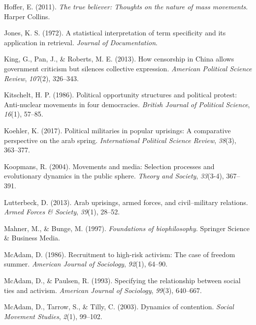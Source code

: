 \documentclass[
  english,
  man]{apa6}
\begin{document}
\leavevmode\hypertarget{ref-Hoffer2011true}{}%
Hoffer, E. (2011). \emph{The true believer: Thoughts on the nature of mass movements}. Harper Collins.

\leavevmode\hypertarget{ref-jones1972statistical}{}%
Jones, K. S. (1972). A statistical interpretation of term specificity and its application in retrieval. \emph{Journal of Documentation}.

\leavevmode\hypertarget{ref-king2013censorship}{}%
King, G., Pan, J., \& Roberts, M. E. (2013). How censorship in China allows government criticism but silences collective expression. \emph{American Political Science Review}, \emph{107}(2), 326--343.

\leavevmode\hypertarget{ref-kitschelt1986political}{}%
Kitschelt, H. P. (1986). Political opportunity structures and political protest: Anti-nuclear movements in four democracies. \emph{British Journal of Political Science}, \emph{16}(1), 57--85.

\leavevmode\hypertarget{ref-koehler2017political}{}%
Koehler, K. (2017). Political militaries in popular uprisings: A comparative perspective on the arab spring. \emph{International Political Science Review}, \emph{38}(3), 363--377.

\leavevmode\hypertarget{ref-koopmans2004movements}{}%
Koopmans, R. (2004). Movements and media: Selection processes and evolutionary dynamics in the public sphere. \emph{Theory and Society}, \emph{33}(3-4), 367--391.

\leavevmode\hypertarget{ref-lutterbeck2013arab}{}%
Lutterbeck, D. (2013). Arab uprisings, armed forces, and civil--military relations. \emph{Armed Forces \& Society}, \emph{39}(1), 28--52.

\leavevmode\hypertarget{ref-mahner1997foundations}{}%
Mahner, M., \& Bunge, M. (1997). \emph{Foundations of biophilosophy}. Springer Science \& Business Media.

\leavevmode\hypertarget{ref-mcadam1986recruitment}{}%
McAdam, D. (1986). Recruitment to high-risk activism: The case of freedom summer. \emph{American Journal of Sociology}, \emph{92}(1), 64--90.

\leavevmode\hypertarget{ref-mcadam1993specifying}{}%
McAdam, D., \& Paulsen, R. (1993). Specifying the relationship between social ties and activism. \emph{American Journal of Sociology}, \emph{99}(3), 640--667.

\leavevmode\hypertarget{ref-mcadam2003dynamics}{}%
McAdam, D., Tarrow, S., \& Tilly, C. (2003). Dynamics of contention. \emph{Social Movement Studies}, \emph{2}(1), 99--102.
\end{document}
